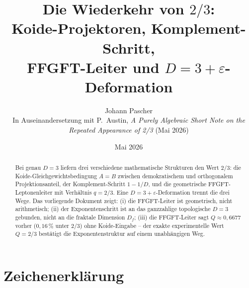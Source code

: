 
\title{Die Wiederkehr von \(2/3\):\\[0.4em]
\large Koide-Projektoren, Komplement-Schritt,\\
FFGFT-Leiter und \(D = 3+\varepsilon\)-Deformation}
\author{Johann Pascher\\[0.3em]
\small In Auseinandersetzung mit P.~Austin,
\textit{A Purely Algebraic Short Note on the Repeated Appearance of 2/3}
(Mai 2026)}
\date{Mai 2026}
\maketitle

\begin{abstract}
Bei genau \(D = 3\) liefern drei verschiedene mathematische Strukturen den
Wert \(2/3\): die Koide-Gleichgewichtsbedingung \(A = B\) zwischen
demokratischem und orthogonalem Projektionsanteil,
der Komplement-Schritt \(1 - 1/D\),
und die geometrische FFGFT-Leptonenleiter mit Verhältnis \(q = 2/3\).
Eine \(D = 3+\varepsilon\)-Deformation trennt die drei Wege.
Das vorliegende Dokument zeigt:
(i) die FFGFT-Leiter ist geometrisch, nicht arithmetisch;
(ii) der Exponentenschritt ist an das ganzzahlige topologische \(D=3\)
gebunden, nicht an die fraktale Dimension \(D_f\);
(iii) die FFGFT-Leiter sagt \(Q \approx 0{,}6677\) vorher
(\(0{,}16\,\%\) unter \(2/3\)) ohne Koide-Eingabe --
der exakte experimentelle Wert \(Q = 2/3\) bestätigt die
Exponentenstruktur auf einem unabhängigen Weg.
\end{abstract}

\tableofcontents

\section*{Zeichenerklärung}

